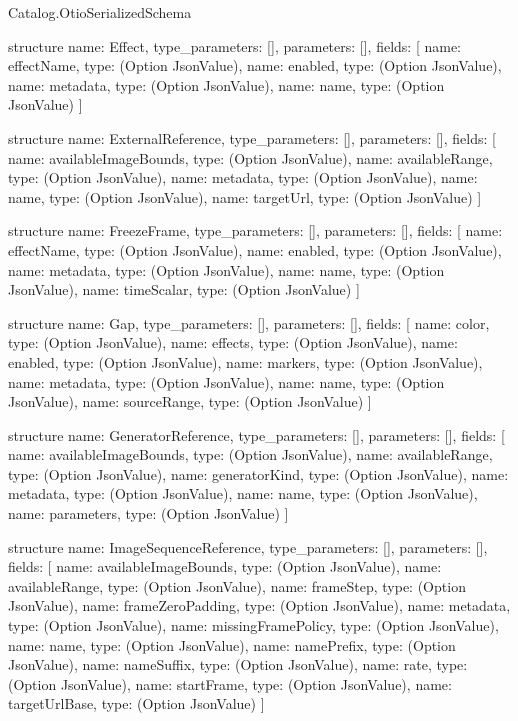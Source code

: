 \begin{lexlean}{Catalog.OtioSerializedSchema}
\begin{semanticmodule}
structure{
  name: Effect,
  type_parameters: [],
  parameters: [],
  fields: [
    {name: effectName, type: (Option JsonValue)},
    {name: enabled, type: (Option JsonValue)},
    {name: metadata, type: (Option JsonValue)},
    {name: name, type: (Option JsonValue)}
  ]
}

structure{
  name: ExternalReference,
  type_parameters: [],
  parameters: [],
  fields: [
    {name: availableImageBounds, type: (Option JsonValue)},
    {name: availableRange, type: (Option JsonValue)},
    {name: metadata, type: (Option JsonValue)},
    {name: name, type: (Option JsonValue)},
    {name: targetUrl, type: (Option JsonValue)}
  ]
}

structure{
  name: FreezeFrame,
  type_parameters: [],
  parameters: [],
  fields: [
    {name: effectName, type: (Option JsonValue)},
    {name: enabled, type: (Option JsonValue)},
    {name: metadata, type: (Option JsonValue)},
    {name: name, type: (Option JsonValue)},
    {name: timeScalar, type: (Option JsonValue)}
  ]
}

structure{
  name: Gap,
  type_parameters: [],
  parameters: [],
  fields: [
    {name: color, type: (Option JsonValue)},
    {name: effects, type: (Option JsonValue)},
    {name: enabled, type: (Option JsonValue)},
    {name: markers, type: (Option JsonValue)},
    {name: metadata, type: (Option JsonValue)},
    {name: name, type: (Option JsonValue)},
    {name: sourceRange, type: (Option JsonValue)}
  ]
}

structure{
  name: GeneratorReference,
  type_parameters: [],
  parameters: [],
  fields: [
    {name: availableImageBounds, type: (Option JsonValue)},
    {name: availableRange, type: (Option JsonValue)},
    {name: generatorKind, type: (Option JsonValue)},
    {name: metadata, type: (Option JsonValue)},
    {name: name, type: (Option JsonValue)},
    {name: parameters, type: (Option JsonValue)}
  ]
}

structure{
  name: ImageSequenceReference,
  type_parameters: [],
  parameters: [],
  fields: [
    {name: availableImageBounds, type: (Option JsonValue)},
    {name: availableRange, type: (Option JsonValue)},
    {name: frameStep, type: (Option JsonValue)},
    {name: frameZeroPadding, type: (Option JsonValue)},
    {name: metadata, type: (Option JsonValue)},
    {name: missingFramePolicy, type: (Option JsonValue)},
    {name: name, type: (Option JsonValue)},
    {name: namePrefix, type: (Option JsonValue)},
    {name: nameSuffix, type: (Option JsonValue)},
    {name: rate, type: (Option JsonValue)},
    {name: startFrame, type: (Option JsonValue)},
    {name: targetUrlBase, type: (Option JsonValue)}
  ]
}


\end{semanticmodule}
\end{lexlean}
